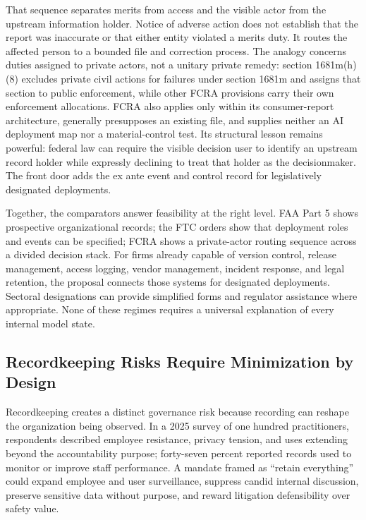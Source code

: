 That sequence separates merits from access and the visible actor from the upstream information holder. Notice of adverse action does not establish that the report was inaccurate or that either entity violated a merits duty. It routes the affected person to a bounded file and correction process. The analogy concerns duties assigned to private actors, not a unitary private remedy: section 1681m(h)(8) excludes private civil actions for failures under section 1681m and assigns that section to public enforcement, while other FCRA provisions carry their own enforcement allocations. FCRA also applies only within its consumer-report architecture, generally presupposes an existing file, and supplies neither an AI deployment map nor a material-control test. Its structural lesson remains powerful: federal law can require the visible decision user to identify an upstream record holder while expressly declining to treat that holder as the decisionmaker. The front door adds the ex ante event and control record for legislatively designated deployments.

Together, the comparators answer feasibility at the right level. FAA Part 5 shows prospective organizational records; the FTC orders show that deployment roles and events can be specified; FCRA shows a private-actor routing sequence across a divided decision stack. For firms already capable of version control, release management, access logging, vendor management, incident response, and legal retention, the proposal connects those systems for designated deployments. Sectoral designations can provide simplified forms and regulator assistance where appropriate. None of these regimes requires a universal explanation of every internal model state.

\subsection{Recordkeeping Risks Require Minimization by Design}

Recordkeeping creates a distinct governance risk because recording can reshape the organization being observed. In a 2025 survey of one hundred practitioners, respondents described employee resistance, privacy tension, and uses extending beyond the accountability purpose; forty-seven percent reported records used to monitor or improve staff performance. A mandate framed as ``retain everything'' could expand employee and user surveillance, suppress candid internal discussion, preserve sensitive data without purpose, and reward litigation defensibility over safety value.

